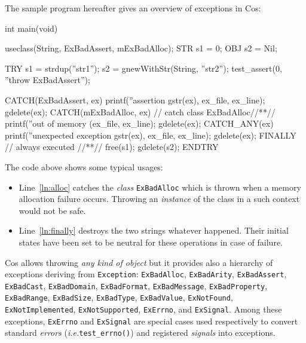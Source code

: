 \documentclass[preprint,10pt]{sigplanconf}
\newcommand{\abbrev}[1]{{\em #1}\xspace}
\newcommand{\ie}{\abbrev{i.e.}}
\newcommand{\ProgLang}[1]{{\sc #1}\xspace}
\newcommand{\Cos}       {\ProgLang{Cos}}
\newcommand{\code}[1]{\lstinline[language=COS,style=samplecode]|#1|}
\begin{document}
The sample program hereafter gives an overview of exceptions in \Cos:
\begin{COS}[left]
int main(void) {
  useclass(String, ExBadAssert, mExBadAlloc);
  STR s1 = 0;
  OBJ s2 = Nil;
  
  TRY
    s1 = strdup(''str1'');
    s2 = gnewWithStr(String, ''str2'');
    test_assert(0, ''throw ExBadAssert'');

  CATCH(ExBadAssert, ex)
    printf(''assertion gstr(ex), ex_file, ex_line);
    gdelete(ex);
  CATCH(mExBadAlloc, ex) // catch class ExBadAlloc//*\label{ln:alloc}*//
    printf(''out of memory (ex_file, ex_line);
    gdelete(ex);
  CATCH_ANY(ex)
    printf(''unexpected exception gstr(ex), ex_file, ex_line);
    gdelete(ex);   
  FINALLY // always executed //*\label{ln:finally}*//
    free(s1);
    gdelete(s2);
  ENDTRY
}
\end{COS}
The code above shows some typical usages:
\begin{itemize}
\item Line~\ref{ln:alloc} catches the {\em class} \code{ExBadAlloc} which is thrown when a memory allocation failure occurs. Throwing an {\em instance} of the class in a such context would not be safe.

\item Line~\ref{ln:finally} destroys the two strings whatever happened. Their initial states have been set to be neutral for these operations in case of failure.
\end{itemize}
\Cos allows throwing {\em any kind of object} but it provides also a hierarchy of exceptions deriving from \code{Exception}:
{\small\tt Ex\-Bad\-Alloc},
{\small\tt Ex\-Bad\-Arity},
{\small\tt Ex\-Bad\-Assert},
{\small\tt Ex\-Bad\-Cast},
{\small\tt Ex\-Bad\-Domain},
{\small\tt Ex\-Bad\-Format},
{\small\tt Ex\-Bad\-Mes\-sage},
{\small\tt Ex\-Bad\-Pro\-perty},
{\small\tt Ex\-Bad\-Range},
{\small\tt Ex\-Bad\-Size},
{\small\tt Ex\-Bad\-Type},
{\small\tt Ex\-Bad\-Value},
{\small\tt Ex\-Not\-Found},
{\small\tt Ex\-Not\-Imple\-men\-ted},
{\small\tt Ex\-Not\-Sup\-por\-ted},
{\small\tt Ex\-Errno},
and
{\small\tt Ex\-Signal}.
Among these exceptions, \code{ExErrno} and \code{ExSignal} are special cases used respectively to convert standard {\em errors} (\ie \code{test_errno()}) and registered {\em signals} into exceptions.
\end{document}
